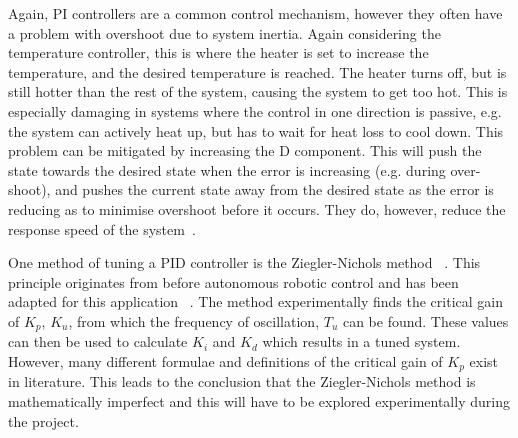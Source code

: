 Again, PI controllers are a common control mechanism, however they often have 
a problem with overshoot due to system inertia. Again considering the 
temperature controller, this is where the heater is set to increase the 
temperature, and the desired temperature is reached. The heater turns off, but 
is still hotter than the rest of the system, causing the system to get too hot. 
This is especially damaging in systems where the control in one direction 
is passive, e.g. the system can actively heat up, but has to wait for heat loss 
to cool down. This problem can be mitigated by increasing the D component. 
This will push the state towards the desired state when the error is increasing 
(e.g. during over-shoot), and pushes the current state away from the desired 
state as the error is reducing as to minimise overshoot before it 
occurs. They do, however, reduce the response speed of the system~\cite{chen2007linear}.

One method of tuning a PID controller is the Ziegler-Nichols method~
\cite{ziegler1942optimum}. This principle originates from before autonomous 
robotic control and has been adapted for this application~
\cite{aastrom2004revisiting}. The method experimentally finds the critical gain 
of $K_p$, $K_u$, from which the frequency of oscillation, $T_u$ can be found. 
These values can then be used to calculate $K_i$ and $K_d$ which results in a 
tuned system. However, many different formulae and definitions of the critical 
gain of $K_p$ exist in literature. This leads to the conclusion that the 
Ziegler-Nichols method is mathematically imperfect and this will have to be 
explored experimentally during the project.      

